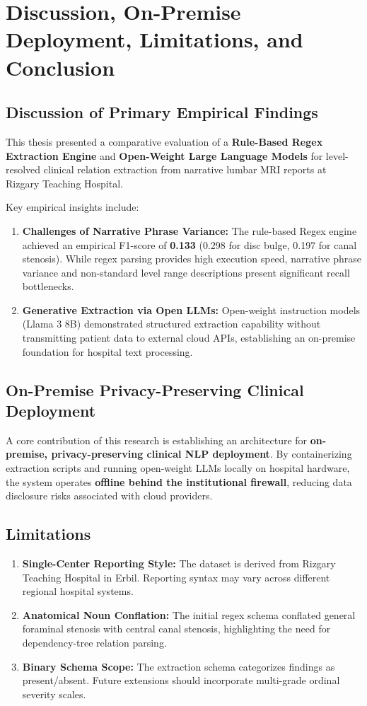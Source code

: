 \chapter{Discussion, On-Premise Deployment, Limitations, and Conclusion}
\label{ch:discussion}

\section{Discussion of Primary Empirical Findings}
This thesis presented a comparative evaluation of a \textbf{Rule-Based Regex Extraction Engine} and \textbf{Open-Weight Large Language Models} for level-resolved clinical relation extraction from narrative lumbar MRI reports at Rizgary Teaching Hospital.

Key empirical insights include:
\begin{enumerate}
    \item \textbf{Challenges of Narrative Phrase Variance:} The rule-based Regex engine achieved an empirical F1-score of \textbf{0.133} (0.298 for disc bulge, 0.197 for canal stenosis). While regex parsing provides high execution speed, narrative phrase variance and non-standard level range descriptions present significant recall bottlenecks.
    \item \textbf{Generative Extraction via Open LLMs:} Open-weight instruction models (Llama 3 8B) demonstrated structured extraction capability without transmitting patient data to external cloud APIs, establishing an on-premise foundation for hospital text processing.
\end{enumerate}

\section{On-Premise Privacy-Preserving Clinical Deployment}
A core contribution of this research is establishing an architecture for \textbf{on-premise, privacy-preserving clinical NLP deployment}. By containerizing extraction scripts and running open-weight LLMs locally on hospital hardware, the system operates \textbf{offline behind the institutional firewall}, reducing data disclosure risks associated with cloud providers.

\section{Limitations}
\begin{enumerate}
    \item \textbf{Single-Center Reporting Style:} The dataset is derived from Rizgary Teaching Hospital in Erbil. Reporting syntax may vary across different regional hospital systems.
    \item \textbf{Anatomical Noun Conflation:} The initial regex schema conflated general foraminal stenosis with central canal stenosis, highlighting the need for dependency-tree relation parsing.
    \item \textbf{Binary Schema Scope:} The extraction schema categorizes findings as present/absent. Future extensions should incorporate multi-grade ordinal severity scales.
\end{enumerate}

